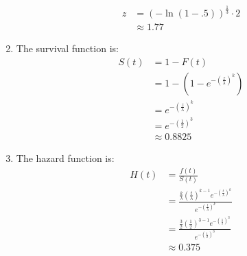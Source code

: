\documentclass{article}
\begin{document}
\begin{enumerate}
\begin{align*}
z &= (-\ln(1 - .5))^{\frac{1}{3}} \cdot 2 \\
&\approx 1.77
\end{align*}
\item The survival function is: \\
\begin{align*}
S(t) &= 1 - F(t) \\
&= 1 - (1 - e^{-(\frac{z}{\lambda})^k}) \\
& = e^{-(\frac{z}{\lambda})^k} \\
&=  e^{-(\frac{1}{2})^3} \\
&\approx 0.8825
\end{align*}
\item The hazard function is: \\
\begin{align*}
H(t) &= \frac{f(t)}{S(t)} \\
&= \frac{\frac{k}{\lambda} (\frac{t}{\lambda})^{k-1}e^{-(\frac{t}{\lambda})^k}}{e^{-(\frac{t}{\lambda})^k}} \\
&= \frac{\frac{3}{2} (\frac{1}{2})^{3-1}e^{-(\frac{1}{2})^3}}{e^{-(\frac{1}{2})^3}} \\
&\approx 0.375
\end{align*}
\end{enumerate}
\end{document}
